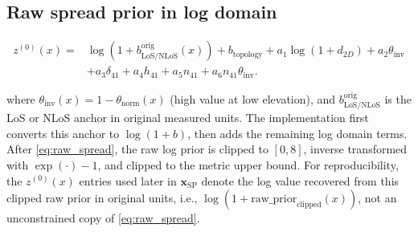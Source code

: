 \subsection{Raw spread prior in log domain}

\begin{equation}
\begin{aligned}
z^{(0)}(x)
={}&
\log\!\left(1+b^{\mathrm{orig}}_{\mathrm{LoS/NLoS}}(x)\right)
+ b_{\mathrm{topology}}
+ a_1\log(1+d_{2D})
+ a_2\theta_{\mathrm{inv}}
\\
&+
a_3\delta_{41}
+ a_4 h_{41}
+ a_5 n_{41}
+ a_6 n_{41}\theta_{\mathrm{inv}} .
\end{aligned}
\label{eq:raw_spread}
\end{equation}

where $\theta_{\mathrm{inv}}(x) = 1 - \theta_{\mathrm{norm}}(x)$ (high value
at low elevation), and \(b^{\mathrm{orig}}_{\mathrm{LoS/NLoS}}\) is the
LoS or NLoS anchor in original measured units. The implementation first
converts this anchor to \(\log(1+b)\), then adds the remaining log domain
terms. After \eqref{eq:raw_spread}, the raw log prior is clipped to $[0,8]$,
inverse transformed with $\exp(\cdot)-1$, and clipped to the metric upper
bound. For reproducibility, the \(z^{(0)}(x)\) entries used later in
\(\textbf{x}_{\mathrm{SP}}\) denote the log value recovered from this clipped
raw prior in original units, i.e.,
\(\log(1+\mathrm{raw\_prior}_{\mathrm{clipped}}(x))\), not an unconstrained
copy of \eqref{eq:raw_spread}.

